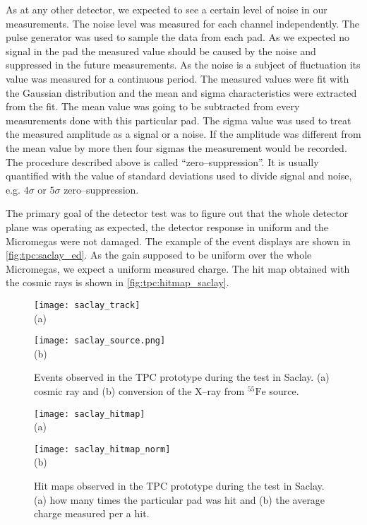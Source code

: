\documentclass[../main.tex]{subfiles}
\begin{document}
As at any other detector, we expected to see a certain level of noise in our measurements. The noise level was measured for each channel independently. The pulse generator was used to sample the data from each pad. As we expected no signal in the pad the measured value should be caused by the noise and suppressed in the future measurements. As the noise is a subject of fluctuation its value was measured for a continuous period. The measured values were fit with the Gaussian distribution and the mean and sigma characteristics were extracted from the fit. The mean value was going to be subtracted from every measurements done with this particular pad. The sigma value was used to treat the measured amplitude as a signal or a noise. If the amplitude was different from the mean value by more then four sigmas the measurement would be recorded. The procedure described above is called ``zero--suppression''. It is usually quantified with the value of standard deviations used to divide signal and noise, e.g. $4\sigma$ or $5\sigma$ zero--suppression.

The primary goal of the detector test was to figure out that the whole detector plane was operating as expected, the detector response in uniform and the Micromegas were not damaged. The example of the event displays are shown in \autoref{fig:tpc:saclay_ed}. As the gain supposed to be uniform over the whole Micromegas, we expect a uniform measured charge. The hit map obtained with the cosmic rays is shown in \autoref{fig:tpc:hitmap_saclay}.

\begin{figure}[!ht]
  \centering
  \begin{minipage}{0.49\linewidth}
  \centering
    \texttt{[image: saclay\_track]} \\ (a)
  \end{minipage}
  \begin{minipage}{0.49\linewidth}
  \centering
    \texttt{[image: saclay\_source.png]} \\ (b)
  \end{minipage}
  \caption{Events observed in the TPC prototype during the test in Saclay. (a) cosmic ray and (b) conversion of the X--ray from ${}^55\text{Fe}$ source.}
  \label{fig:tpc:saclay_ed}
\end{figure}

\begin{figure}[!ht]
  \centering
  \begin{minipage}{0.49\linewidth}
  \centering
    \texttt{[image: saclay\_hitmap]} \\ (a)
  \end{minipage}
  \begin{minipage}{0.49\linewidth}
  \centering
    \texttt{[image: saclay\_hitmap\_norm]} \\ (b)
  \end{minipage}
  \caption{Hit maps observed in the TPC prototype during the test in Saclay. (a) how many times the particular pad was hit and (b) the average charge measured per a hit.}
  \label{fig:tpc:hitmap_saclay}
\end{figure}
\end{document}
